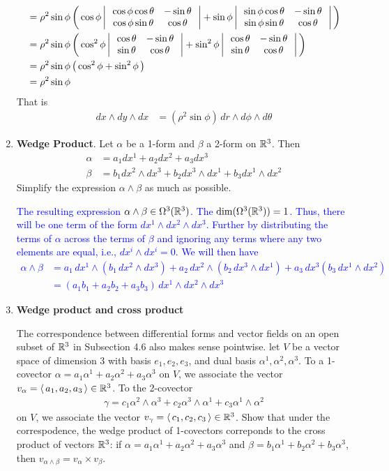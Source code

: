 \documentclass[10pt,a4paper]{report}
\newcommand{\BLUE}[1]{\textcolor{blue}{#1}}
\begin{document}
\begin{enumerate}[label=4.\arabic*]
{\begin{align*}
	&= \rho^2\sin\phi \left (\, \cos\phi\left |\,  \begin{array}{c c} \cos\phi\cos\theta&-\sin\theta \\ \cos\phi\sin\theta & \cos\theta \end{array}  \,\right | +\sin\phi\left |\,  \begin{array}{c c} \sin\phi\cos\theta&-\sin\theta \\ \sin\phi\sin\theta & \cos\theta \end{array}  \,\right |  \,\right )\\
	&= \rho^2\sin\phi \left (\, \cos^2\phi\left |\,  \begin{array}{c c} \cos\theta&-\sin\theta \\ \sin\theta & \cos\theta \end{array}  \,\right | +\sin^2\phi\left |\,  \begin{array}{c c} \cos\theta&-\sin\theta \\ \sin\theta & \cos\theta \end{array}  \,\right |  \,\right )\\
	&= \rho^2\sin\phi \left (\, \cos^2\phi +\sin^2\phi \,\right ) \\
	&= \rho^2\sin\phi
\end{align*}That is
\begin{align*}
	dx\wedge dy\wedge dx &= (\rho^2\sin\phi) \,dr\wedge d\phi \wedge d\theta
\end{align*}
}

\item \textbf{Wedge Product}. Let $\alpha$ be a 1-form and $\beta$ a 2-form on $\mathbb{R}^3$.  Then 
\begin{align*}
	\alpha &= a_1dx^1+a_2dx^2+a_3dx^3 \\
	\beta &= b_1 dx^2\wedge dx^3 + b_2 dx^3 \wedge dx^1 + b_3dx^1\wedge dx^2
\end{align*}Simplify the expression $\alpha \wedge \beta$ as much as possible.

\BLUE{The resulting expression $\alpha\wedge\beta\in \Omega^3(\mathbb{R}^3)$.  The $\dim(\Omega^3(\mathbb{R}^3)) = 1$.  Thus, there will be one term of the form $dx^1\wedge dx^2\wedge dx^3$.  Further by distributing the terms of $\alpha$ across the terms of $\beta$ and ignoring any terms where any two elements are equal, i.e., $dx^i\wedge dx^i =0$.  We will then have
\begin{align*}
	\alpha \wedge \beta &= a_1\,dx^1\wedge(b_1\,dx^2\wedge dx^3)+a_2\,dx^2\wedge(b_2\,dx^3\wedge dx^1)+a_3\,dx^3(b_3\,dx^1\wedge dx^2) \\
	&= (a_1b_1+a_2b_2+a_3b_3)\, dx^1\wedge dx^2\wedge dx^3
\end{align*}
}

\item \textbf{Wedge product and cross product}

The correspondence between differential forms and vector fields on an open subset of $\mathbb{R}^3$ in Subsection 4.6 also makes sense pointwise.  let $V$ be a vector space of dimension 3 with basis $e_1, e_2, e_3$,  and dual basis $\alpha^1, \alpha^2, \alpha^3$.  To a 1-covector $\alpha=a_1\alpha^1+a_2\alpha^2+a_3\alpha^3$ on $V$, we associate the vector $v_\alpha = \left \langle\, a_1,a_2,a_3 \,\right \rangle \in \mathbb{R}^3$.  To the 2-covector
\begin{align*}
	\gamma = c_1 \alpha^2\wedge \alpha^3 + c_2\alpha^3\wedge\alpha^1 + c_3\alpha^1\wedge\alpha^2
\end{align*}on $V$, we associate the vector $v_\gamma=\left \langle\, c_1,c_2,c_3 \,\right \rangle\in \mathbb{R}^3$.  Show that under the correspodence, the wedge product of 1-covectors correponds to the cross product of vectors $\mathbb{R}^3$:  if $\alpha = a_1\alpha^1+a_2\alpha^2+a_3\alpha^3$ and $\beta = b_1\alpha^1+b_2\alpha^2+b_3\alpha^3$, then $v_{\alpha\wedge\beta}= v_\alpha \times v_\beta$.

\end{enumerate}
\end{document}
